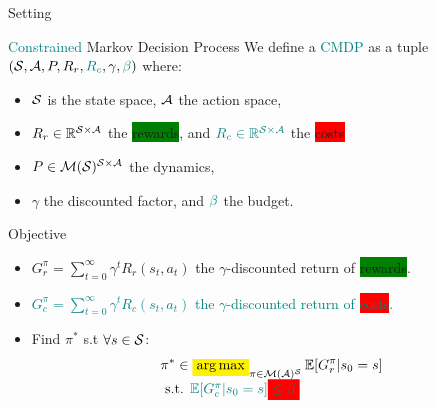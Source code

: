 \documentclass{beamer}
\newcommand{\mathcolorbox}[2]{\colorbox{#1}{$\displaystyle #2$}}
\begin{document}
    \begin{frame}{Setting}
        \begin{block}{\textcolor{teal}{Constrained} Markov Decision Process}
            We define a \textcolor{teal}{CMDP} as a tuple $(\mathcal{S}, \mathcal{A}, P, R_r,\textcolor{teal}{R_c}, \gamma,\textcolor{teal}{\beta})$ where:
            \begin{itemize}
                \item  $\mathcal{S}$ is the state space, $\mathcal{A}$ the action space,
                \item $R_r\in\mathbb{R}^{\mathcal{S} \times \mathcal{A}}$ the \colorbox{green}{rewards}, and $\textcolor{teal}{R_c\in\mathbb{R}^{\mathcal{S} \times \mathcal{A}}}$ the \colorbox{red}{costs}
                \item $P\in \mathcal{M}(\mathcal{S})^{\mathcal{S} \times \mathcal{A}}$ the dynamics, %
                \item $\gamma$ the discounted factor, and $\textcolor{teal}{\beta}$ the budget.
            \end{itemize}
        \end{block}

        \begin{block}{Objective}
            \begin{itemize}
                \item $G_r^\pi = \sum_{t=0}^\infty \gamma^t R_r(s_t, a_t)$ the $\gamma$-discounted return of \colorbox{green}{rewards}.
                \item \textcolor{teal}{ $G_c^\pi = \sum_{t=0}^\infty \gamma^t R_c(s_t, a_t)$ the $\gamma$-discounted return of \colorbox{red}{costs}.}
                \item Find $\pi^*$ s.t $\forall s\in\mathcal{S}$:
                \begin{equation}
                    \label{eq:cmdp}
                    \begin{array}{lcr}
                        \displaystyle \pi^* \in \mathcolorbox{yellow}{\argmax}_{\pi\in\cM(\cA)^\cS} \expectedvalue[G_r^\pi | s_0=s] \\
                        \text{ s.t. }  \textcolor{teal}{\expectedvalue[G_c^\pi | s_0=s] \mathcolorbox{red}{\leq \beta}}
                    \end{array}
                \end{equation}
            \end{itemize}
        \end{block}
    \end{frame}
\end{document}
